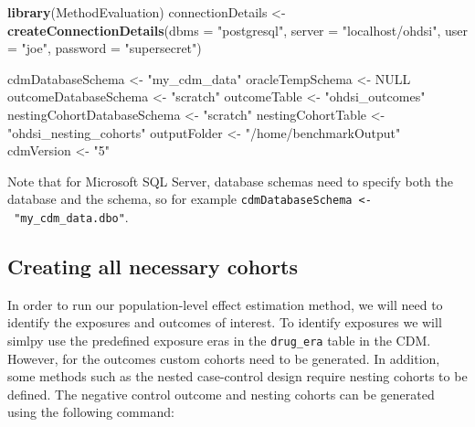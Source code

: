 \documentclass[]{article}
\newenvironment{Shaded}{\begin{snugshade}}{\end{snugshade}}
\newcommand{\DataTypeTok}[1]{\textcolor[rgb]{0.13,0.29,0.53}{#1}}
\newcommand{\KeywordTok}[1]{\textcolor[rgb]{0.13,0.29,0.53}{\textbf{#1}}}
\newcommand{\NormalTok}[1]{#1}
\newcommand{\OtherTok}[1]{\textcolor[rgb]{0.56,0.35,0.01}{#1}}
\newcommand{\StringTok}[1]{\textcolor[rgb]{0.31,0.60,0.02}{#1}}
\begin{document}
\begin{Shaded}
\begin{Highlighting}[]
\KeywordTok{library}\NormalTok{(MethodEvaluation)}
\NormalTok{connectionDetails <-}\StringTok{ }\KeywordTok{createConnectionDetails}\NormalTok{(}\DataTypeTok{dbms =} \StringTok{"postgresql"}\NormalTok{, }
                                             \DataTypeTok{server =} \StringTok{"localhost/ohdsi"}\NormalTok{, }
                                             \DataTypeTok{user =} \StringTok{"joe"}\NormalTok{, }
                                             \DataTypeTok{password =} \StringTok{"supersecret"}\NormalTok{)}

\NormalTok{cdmDatabaseSchema <-}\StringTok{ "my_cdm_data"}
\NormalTok{oracleTempSchema <-}\StringTok{ }\OtherTok{NULL}
\NormalTok{outcomeDatabaseSchema <-}\StringTok{ "scratch"}
\NormalTok{outcomeTable <-}\StringTok{ "ohdsi_outcomes"}
\NormalTok{nestingCohortDatabaseSchema <-}\StringTok{ "scratch"}
\NormalTok{nestingCohortTable <-}\StringTok{ "ohdsi_nesting_cohorts"}
\NormalTok{outputFolder <-}\StringTok{ "/home/benchmarkOutput"}
\NormalTok{cdmVersion <-}\StringTok{ "5"}
\end{Highlighting}
\end{Shaded}

Note that for Microsoft SQL Server, database schemas need to specify
both the database and the schema, so for example
\texttt{cdmDatabaseSchema\ \textless{}-\ "my\_cdm\_data.dbo"}.

\hypertarget{creating-all-necessary-cohorts}{%
\subsection{Creating all necessary
cohorts}\label{creating-all-necessary-cohorts}}

In order to run our population-level effect estimation method, we will
need to identify the exposures and outcomes of interest. To identify
exposures we will simlpy use the predefined exposure eras in the
\texttt{drug\_era} table in the CDM. However, for the outcomes custom
cohorts need to be generated. In addition, some methods such as the
nested case-control design require nesting cohorts to be defined. The
negative control outcome and nesting cohorts can be generated using the
following command:
\end{document}
